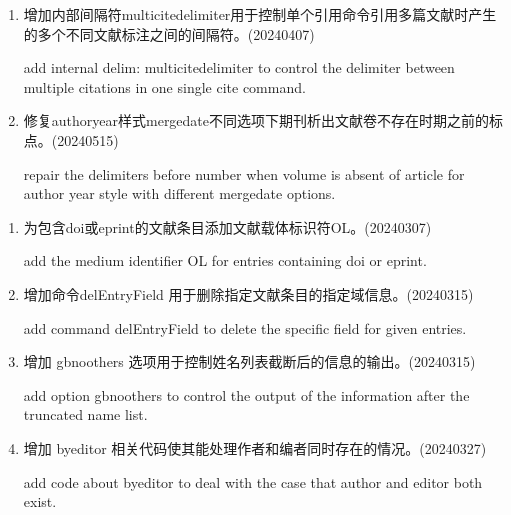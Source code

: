\label{up:20240515}
\begin{enumerate}

\item 增加内部间隔符multicitedelimiter用于控制单个引用命令引用多篇文献时产生的多个不同文献标注之间的间隔符。(20240407)

add internal delim: multicitedelimiter to control the delimiter between multiple citations in one single cite command.


\item 修复authoryear样式mergedate不同选项下期刊析出文献卷不存在时期之前的标点。(20240515)

repair the delimiters before number when volume is absent of article for author year style with different  mergedate options.

\end{enumerate}

\label{up:20240327}
\begin{enumerate}

\item 为包含doi或eprint的文献条目添加文献载体标识符OL。(20240307)

add the medium identifier OL for entries containing doi or eprint.

\item 增加命令delEntryField 用于删除指定文献条目的指定域信息。(20240315)

add command delEntryField to delete the specific field for given entries.

\item 增加 gbnoothers 选项用于控制姓名列表截断后的信息的输出。(20240315)

add option gbnoothers to control the output of the information after the truncated name list.

\item 增加 byeditor 相关代码使其能处理作者和编者同时存在的情况。(20240327)

add code about byeditor to deal with the case that author and editor both exist.

\end{enumerate}



